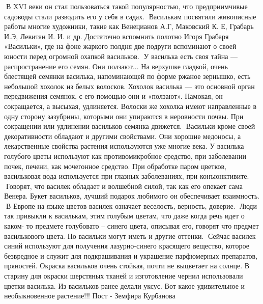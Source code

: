 🔹В XVI веки он стал пользоваться такой популярностью, что предприимчивые садоводы стали разводить его у себя в садах.
🔹Василькам посвятили живописные работы многие художники, такие как Венецианов А.Г, Маковский К. Е, Грабарь И.Э, Левитан И. И. и др. 
Достаточно вспомнить полотно Игоря Грабаря «Васильки», где на фоне жаркого полдня две подруги вспоминают о своей юности перед огромной охапкой васильков.
🔹У василька есть своя тайна — распространение его семян. 
Они ползают...
На верхушке гладкой, очень блестящей семянки василька, напоминающей по форме ржаное зернышко, есть небольшой хохолок из белых волосков. 
Хохолок василька — это основной орган передвижения семянок, с его помощью они и «ползают».
Намокая, он сокращается, а высыхая, удлиняется. 
Волоски же хохолка имеют направленные в одну сторону зазубрины, которыми они упираются в неровности почвы. При сокращении или удлинении васильков семянка движется.
🔹Васильки кроме своей декоративности обладают и другими свойствами. 
Они хорошие медоносы, а лекарственные свойства растения используются уже многие века. 
У василька голубого цветы используют как противомикробное средство, при заболевании почек, печени, как мочегонное средство. 
При обработке паром цветков, васильковая вода используется при глазных заболеваниях, при конъюнктивите.
🔹Говорят, что василек обладает и волшебной силой, так как его опекает сама Венера. 
Букет васильков, лучший подарок любимого он обеспечивает взаимность.
🔹В Европе на языке цветов василек означает веселость, верность, доверие.
🔹Люди так привыкли к василькам, этим голубым цветам, что даже когда речь идет о каком- то предмете голубовато – синего цвета, описывая его, говорят что предмет василькового цвета. 
Но васильки могут иметь и другие оттенки.
🔹Сейчас василек синий используют для получения лазурно-синего красящего вещество, которое безвредное и служит для подкрашивания и украшение парфюмерных препаратов, пряностей.
Окраска васильков очень стойкая, почти не выцветает на солнце.
В старину для окраски шерстяных тканей и изготовление чернил использовали цветки василька. 
Из васильков ранее делали уксус.
Вот какое удивительное и необыкновенное растение!!!
Пост - Земфира Курбанова
